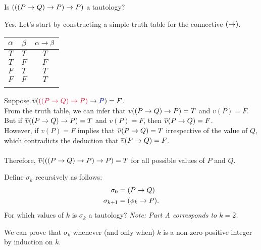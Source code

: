 
\begin{problem}
  \begin{enumalph}
    \item Is $(((P \rightarrow Q) \rightarrow P) \rightarrow P)$ a tautology?
      \begin{Answer}
        Yes. Let's start by constructing a simple truth table for
        the connective $(\rightarrow)$.\\
        \begin{center}
          \begin{tabular}{c c c}
            \bottomrule
            $\alpha$ & $\beta$ & $\alpha \rightarrow \beta$\\
            \midrule
            $T$ & $T$ & $T$\\
            \midrule
            $T$ & $F$ & $F$\\
            \midrule
            $F$ & $T$ & $T$\\
            \midrule
            $F$ & $F$ & $T$\\
            \toprule\\    
          \end{tabular}
        \end{center}
        Suppose $\vbar(\crim{((P \lto Q) \lto P)} \lto \zaff{P}) = F$.\\
        From the truth table, we can infer that $v((P \rightarrow Q) \rightarrow P) = T$ and $v(P) = F$.\\
        But if $\overline{v}((P \rightarrow Q) \rightarrow P) = T$ and $v(P) = F$,
        then $\overline{v}(P \rightarrow Q) = F$.\\
        However, if $v(P) = F$ implies that $\overline{v}(P \rightarrow Q) = T$
        irrespective of the value of $Q$, which contradicts the deduction that $\overline{v}(P \rightarrow Q) = F$.
        \\\\
        Therefore, $\overline{v}(((P \rightarrow Q) \rightarrow P) \rightarrow P) = T$ for all possible values of $P$ and $Q$.
      \end{Answer}
    \item Define $\sigma_k$ recursively as follows:
      \begin{align*}
        \sigma_0 &= (P \rightarrow Q) \\
        \sigma_{k+1} &= (\phi_k \rightarrow P).
      \end{align*}
      For which values of $k$ is $\sigma_k$ a tautology?
      \emph{Note: Part A corresponds to $k=2$.}
      \begin{Answer}
        We can prove that $\sigma_k$ whenever (and only when) $k$ is a non-zero positive integer
        by induction on $k$.
        

\end{Answer}
\end{enumalph}
\end{problem}
